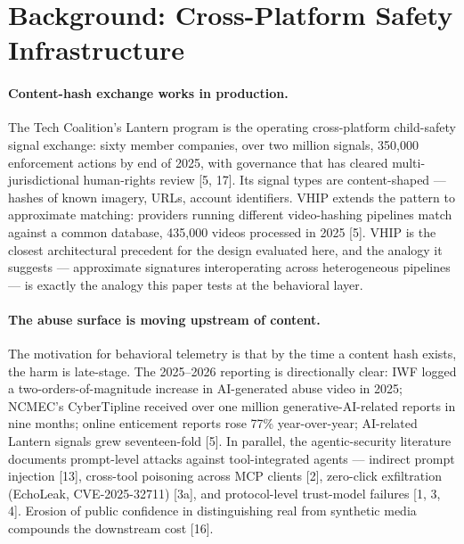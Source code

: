 \documentclass[11pt]{article}
\begin{document}
\section{Background: Cross-Platform Safety Infrastructure}
\label{sec:mcp}

\paragraph{Content-hash exchange works in production.}
The Tech Coalition's Lantern program is the operating cross-platform child-safety signal exchange: sixty member companies, over two million signals, 350{,}000 enforcement actions by end of 2025, with governance that has cleared multi-jurisdictional human-rights review [5, 17]. Its signal types are content-shaped --- hashes of known imagery, URLs, account identifiers. VHIP extends the pattern to approximate matching: providers running different video-hashing pipelines match against a common database, 435{,}000 videos processed in 2025 [5]. VHIP is the closest architectural precedent for the design evaluated here, and the analogy it suggests --- approximate signatures interoperating across heterogeneous pipelines --- is exactly the analogy this paper tests at the behavioral layer.

\paragraph{The abuse surface is moving upstream of content.}
The motivation for behavioral telemetry is that by the time a content hash exists, the harm is late-stage. The 2025--2026 reporting is directionally clear: IWF logged a two-orders-of-magnitude increase in AI-generated abuse video in 2025; NCMEC's CyberTipline received over one million generative-AI-related reports in nine months; online enticement reports rose 77\% year-over-year; AI-related Lantern signals grew seventeen-fold [5]. In parallel, the agentic-security literature documents prompt-level attacks against tool-integrated agents --- indirect prompt injection [13], cross-tool poisoning across MCP clients [2], zero-click exfiltration (EchoLeak, CVE-2025-32711) [3a], and protocol-level trust-model failures [1, 3, 4]. Erosion of public confidence in distinguishing real from synthetic media compounds the downstream cost [16].
\end{document}
